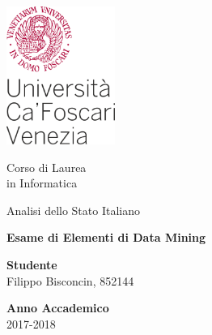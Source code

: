 \frontmatter

\thispagestyle{empty}

\vspace*{-1.5cm}

\includegraphics[height=4.5cm]{images/unive.pdf}

\begin{center}


\vspace*{1.0cm}


\LARGE
Corso di Laurea\\
in Informatica

\vspace*{1.0cm}

Analisi dello Stato Italiano

\vspace*{1.0cm}

\begin{large}
\textbf{Esame di Elementi di Data Mining}
\end{large}

\end{center}

\vspace*{2.5cm} \large

\begin{flushleft}

\textbf{Studente}\\
Filippo Bisconcin, 852144 \\

\vspace*{1.0cm}

\textbf{Anno Accademico}\\
2017-2018
\end{flushleft}
